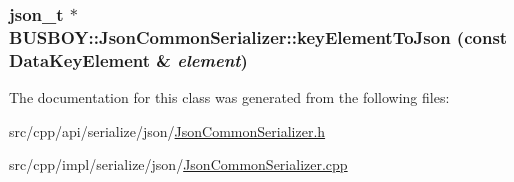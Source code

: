 \hypertarget{classBUSBOY_1_1JsonCommonSerializer_ada75d0fa706d7506674352abf5848543}{
\subsubsection[{keyElementToJson}]{\setlength{\rightskip}{0pt plus 5cm}json\_\-t $\ast$ BUSBOY::JsonCommonSerializer::keyElementToJson (const {\bf DataKeyElement} \& {\em element})}}
\label{classBUSBOY_1_1JsonCommonSerializer_ada75d0fa706d7506674352abf5848543}


The documentation for this class was generated from the following files:\begin{DoxyCompactItemize}
\item 
src/cpp/api/serialize/json/\hyperlink{JsonCommonSerializer_8h}{JsonCommonSerializer.h}\item 
src/cpp/impl/serialize/json/\hyperlink{JsonCommonSerializer_8cpp}{JsonCommonSerializer.cpp}\end{DoxyCompactItemize}
